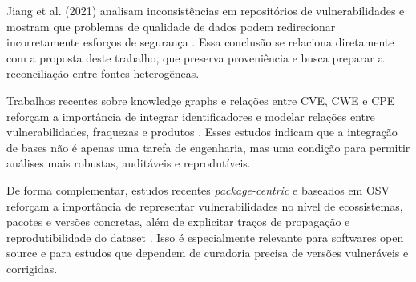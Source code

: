 Jiang et al. (2021) analisam inconsistências em repositórios de vulnerabilidades e mostram que problemas de qualidade de dados podem redirecionar incorretamente esforços de segurança \cite{jiang2021_inconsistency}. Essa conclusão se relaciona diretamente com a proposta deste trabalho, que preserva proveniência e busca preparar a reconciliação entre fontes heterogêneas.

Trabalhos recentes sobre knowledge graphs e relações entre CVE, CWE e CPE reforçam a importância de integrar identificadores e modelar relações entre vulnerabilidades, fraquezas e produtos \cite{shi2024_threat_kg,yin2024_vulkg}. Esses estudos indicam que a integração de bases não é apenas uma tarefa de engenharia, mas uma condição para permitir análises mais robustas, auditáveis e reprodutíveis.

De forma complementar, estudos recentes \textit{package-centric} e baseados em OSV reforçam a importância de representar vulnerabilidades no nível de ecossistemas, pacotes e versões concretas, além de explicitar traços de propagação e reprodutibilidade do dataset \cite{wu2024_affected_libraries,ruohonen2025_osv_propagation,mandl2026_osv_groundtruth}. Isso é especialmente relevante para softwares open source e para estudos que dependem de curadoria precisa de versões vulneráveis e corrigidas.

